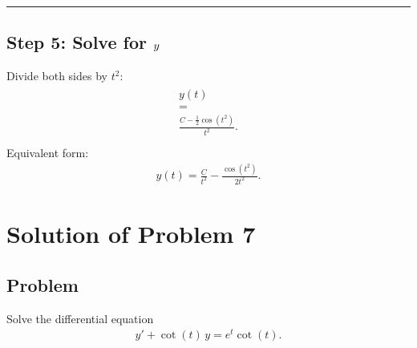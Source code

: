 \documentclass[letterpaper,10pt,english]{sphinxmanual}
\begin{document}
\bigskip\hrule\bigskip



\subsection{Step 5: Solve for \protect\(y\protect\)}
\label{\detokenize{Language/Science_language/ODE_calculus/course_MATH_3035/homework_assignments/index_pdf:id5}}
\sphinxAtStartPar
Divide both sides by \(t^2\):
\begin{align*}\!\begin{aligned}
y(t)\\
=\\
\frac{C-\frac12\cos(t^2)}{t^2}.\\
\end{aligned}\end{align*}
\sphinxAtStartPar
Equivalent form:
\begin{equation*}
\begin{split}\boxed{
y(t)
=
\frac{C}{t^2}
-
\frac{\cos(t^2)}{2t^2}
}.\end{split}
\end{equation*}



\section{Solution of Problem 7}
\label{\detokenize{Language/Science_language/ODE_calculus/course_MATH_3035/homework_assignments/index_pdf:solution-of-problem-7}}

\subsection{Problem}
\label{\detokenize{Language/Science_language/ODE_calculus/course_MATH_3035/homework_assignments/index_pdf:id6}}
\sphinxAtStartPar
Solve the differential equation
\begin{equation*}
\begin{split}y' + \cot(t)\,y = e^t\cot(t).\end{split}
\end{equation*}
\end{document}
